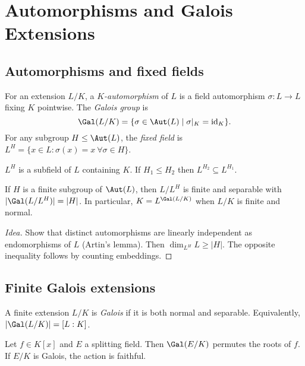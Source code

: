 \section{Automorphisms and Galois Extensions}

\subsection{Automorphisms and fixed fields}

\begin{definition}
For an extension $L/K$, a \emph{$K$-automorphism} of $L$ is a field automorphism $\sigma:L\to L$ fixing $K$ pointwise. The \emph{Galois group} is
\[
\Gal(L/K)=\{\sigma\in \Aut(L)\mid \sigma|_K=\mathrm{id}_K\}.
\]
For any subgroup $H\le \Aut(L)$, the \emph{fixed field} is $L^H=\{x\in L:\sigma(x)=x\ \forall\sigma\in H\}$.
\end{definition}

\begin{proposition}
$L^H$ is a subfield of $L$ containing $K$. If $H_1\le H_2$ then $L^{H_2}\subseteq L^{H_1}$.
\end{proposition}

\begin{theorem}
If $H$ is a finite subgroup of $\Aut(L)$, then $L/L^H$ is finite and separable with $|\Gal(L/L^H)|=|H|$. In particular, $K=L^{\Gal(L/K)}$ when $L/K$ is finite and normal.
\end{theorem}
\begin{proof}[Idea]
Show that distinct automorphisms are linearly independent as endomorphisms of $L$ (Artin's lemma). Then $\dim_{L^H}L\ge|H|$. The opposite inequality follows by counting embeddings.
\end{proof}

\subsection{Finite Galois extensions}

\begin{definition}
A finite extension $L/K$ is \emph{Galois} if it is both normal and separable. Equivalently, $|\Gal(L/K)|=[L:K]$.
\end{definition}

\begin{proposition}
Let $f\in K[x]$ and $E$ a splitting field. Then $\Gal(E/K)$ permutes the roots of $f$. If $E/K$ is Galois, the action is faithful.
\end{proposition}


